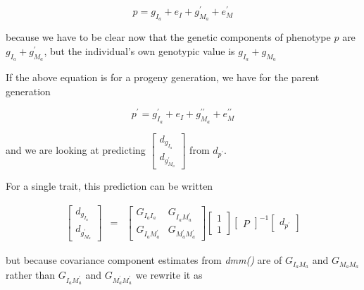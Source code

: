 \documentclass[titlepage]{article}  %
\begin{document}
\begin{equation}
p = g_{I_{a}} + e_{I} + g^{\prime}_{M_{a}} + e^{\prime}_{M}
\end{equation}

because we have to be clear now that the genetic components of phenotype $p$ are $g_{I_{a}} + g^{\prime}_{M_{a}}$, but the individual's own genotypic value is $g_{I_{a}} + g_{M_{a}}$

If the above equation is for a progeny generation, we have for the parent generation

\begin{equation}
p^{\prime} = g^{\prime}_{I_{a}} + e_{I} + g^{\prime\prime}_{M_{a}} + e^{\prime\prime}_{M}
\end{equation}

and we are looking at predicting $  \left[ \begin{array}{c}
 d_{g_{I_{a}}} \\
 d_{g^{\prime}_{M_{a}}}
\end{array} \right]
$ from $d_{p^{\prime}}$.

For a single trait, this prediction can be written

\begin{eqnarray*}
 \left[ \begin{array}{c}
 d_{g_{I_{a}}} \\
 d_{g^{\prime}_{M_{a}}}
\end{array} \right]
 & = &
 \left[ \begin{array}{cc}
 G_{I_{a}I_{a}} & G_{I_{a}M^{\prime}_{a}} \\ 
 G_{I_{a}M^{\prime}_{a}} & G_{M^{\prime}_{a}M^{\prime}_{a}}
\end{array} \right]
 \left[ \begin{array}{c}
 1 \\
 1
\end{array} \right]
\left[ \begin{array}{c}
 P
\end{array} \right] ^{-1}
 \left[ \begin{array}{c}
 d_{p^{\prime}}
\end{array} \right]
\end{eqnarray*}

but because covariance component estimates from {\em dmm()} are of $G_{I_{a}M_{a}}$ and $G_{M_{a}M_{a}}$ rather than $G_{I_{a}M^{\prime}_{a}}$ and $G_{M^{\prime}_{a}M^{\prime}_{a}}$ we rewrite it as 
\end{document}

